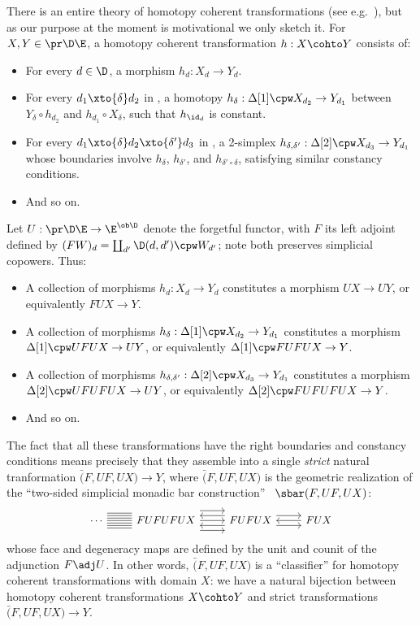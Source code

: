 There is an entire theory of homotopy coherent transformations (see e.g.~\cite{cp:hcct}), but as our purpose at the moment is motivational we only sketch it.
For $X,Y\in\pr\D\E$, a homotopy coherent transformation $h:X\cohto Y$ consists of:
\begin{itemize}
\item For every $d\in \D$, a morphism $h_d:X_d \to Y_d$.
\item For every $d_1\xto{\delta} d_2$ in \D, a homotopy $h_\delta: \Delta[1]\cpw X_{d_2} \to Y_{d_1}$ between $Y_{\delta} \circ h_{d_2}$ and $h_{d_1}\circ X_\delta$, such that $h_{\id_d}$ is constant.
\item For every $d_1\xto{\delta} d_2 \xto{\delta'} d_3$ in \D, a 2-simplex $h_{\delta,\delta'}:\Delta[2]\cpw X_{d_3} \to Y_{d_1}$ whose boundaries involve $h_\delta$, $h_{\delta'}$, and $h_{\delta'\circ\delta}$, satisfying similar constancy conditions.
\item And so on.
\end{itemize}
Let $U:\pr\D\E \to \E^{\ob\D}$ denote the forgetful functor, with $F$ its left adjoint defined by $(F W)_d = \coprod_{d'} \D(d,d') \cpw W_{d'}$; note both preserves simplicial copowers.
Thus:
\begin{itemize}
\item A collection of morphisms $h_d:X_d \to Y_d$ constitutes a morphism $U X \to U Y$, or equivalently $F U X \to Y$.
\item A collection of morphisms $h_\delta: \Delta[1]\cpw X_{d_2} \to Y_{d_1}$ constitutes a morphism $\Delta[1] \cpw U F U X \to U Y$, or equivalently $\Delta[1] \cpw F U F U X \to Y$.
\item A collection of morphisms $h_{\delta,\delta'}:\Delta[2]\cpw X_{d_3} \to Y_{d_1}$ constitutes a morphism $\Delta[2]\cpw U F U F U X \to U Y$, or equivalently $\Delta[2]\cpw F U F U F U X \to Y$.
\item And so on.
\end{itemize}
The fact that all these transformations have the right boundaries and constancy conditions means precisely that they assemble into a single \emph{strict} natural tranformation $\bar(F,UF,UX) \to Y$, where $\bar(F,UF,UX)$ is the geometric realization of the ``two-sided simplicial monadic bar construction''~\cite{may:goils,meyer:bar_i} $\sbar(F,UF,UX)$:
\[\small
  \begin{tikzcd}
    \cdots \ar[r,-] \ar[r,-,shift left=1] \ar[r,-,shift left=2] \ar[r,-,shift left=3]
     \ar[r,-,shift right=1] \ar[r,-,shift right=2] \ar[r,-,shift right=3]
    &
    FUFUFUX \ar[r] \ar[r,shift left=4] \ar[r,shift right=4] &
    FUFUX \ar[r,shift left=2] \ar[r, shift right=2] \ar[l,shift left=2] \ar[l,shift right=2] &
    FUX \ar[l]
  \end{tikzcd}
\]
whose face and degeneracy maps are defined by the unit and counit of the adjunction $F\adj U$.
In other words, $\bar(F,UF,UX)$ is a ``classifier'' for homotopy coherent transformations with domain $X$: we have a natural bijection between homotopy coherent transformations $X\cohto Y$ and strict transformations $\bar(F,UF,UX)\to Y$.

